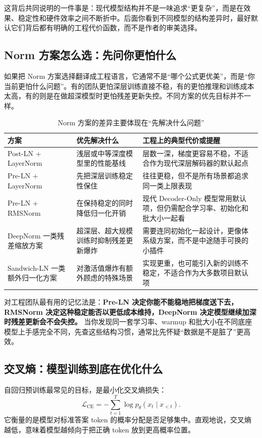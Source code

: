 这背后共同说明的一件事是：现代模型结构并不是一味追求“更复杂”，而是在效果、稳定性和硬件效率之间不断折中。后面你看到不同模型的结构差异时，最好默认它们背后都有明确的工程代价函数，而不是作者的审美选择。

\subsection{Norm 方案怎么选：先问你更怕什么}
如果把 Norm 方案选择翻译成工程语言，它通常不是“哪个公式更优美”，而是“你当前更怕什么问题”。有的团队更怕深层训练直接不稳，有的更怕推理和训练成本太高，有的则是在做超深模型时更怕残差更新失控。不同方案的优先目标并不一样。

\begin{table}[H]
\centering
\small
\begin{tabularx}{\textwidth}{>{\raggedright\arraybackslash}p{2.6cm}>{\raggedright\arraybackslash}p{3cm}>{\raggedright\arraybackslash}X}
\toprule
\textbf{方案} & \textbf{优先解决什么} & \textbf{工程上的典型代价或提醒} \\
\midrule
Post-LN + LayerNorm & 浅层或中等深度模型里的性能基线 & 层数一深，梯度更容易不稳，不适合作为现代深层解码器的默认起点 \\
Pre-LN + LayerNorm & 先把深层训练稳定性保住 & 往往更稳，但不是所有场景都追求同一类上限表现 \\
Pre-LN + RMSNorm & 在保持稳定的同时降低归一化开销 & 现代 Decoder-Only 模型常用默认项，但仍需配合学习率、初始化和批大小一起看 \\
DeepNorm 一类残差缩放方案 & 超深层、超大规模训练时抑制残差更新爆炸 & 需要连同初始化一起设计，更像体系级方案，而不是中途随手可换的小插件 \\
Sandwich-LN 一类额外归一化方案 & 对激活值爆炸有额外顾虑的特殊场景 & 实现更重，也可能引入新的训练不稳定，不适合作为大多数项目默认项 \\
\bottomrule
\end{tabularx}
\caption{Norm 方案的差异主要体现在“先解决什么问题”}
\label{tab:norm-choice}
\end{table}

对工程团队最有用的记忆法是：\textbf{Pre-LN 决定你能不能稳地把梯度送下去，RMSNorm 决定这种稳定能否以更低成本维持，DeepNorm 决定模型继续加深时残差更新会不会失控。} 当你发现同一套学习率、warmup 和批大小在不同底座模型上手感完全不同，先查这些结构习惯，通常比先怀疑“数据是不是脏了”更高效。

\subsection{交叉熵：模型训练到底在优化什么}
自回归预训练最常见的目标，是最小化交叉熵损失：
\[
\mathcal{L}_{\mathrm{CE}}=-\sum_{t=1}^{T}\log p_\theta(x_t \mid x_{<t}).
\]
它衡量的是模型对标准答案 token 的概率分配是否足够集中。直观地说，交叉熵越低，意味着模型越倾向于把正确 token 放到更高概率位置。

